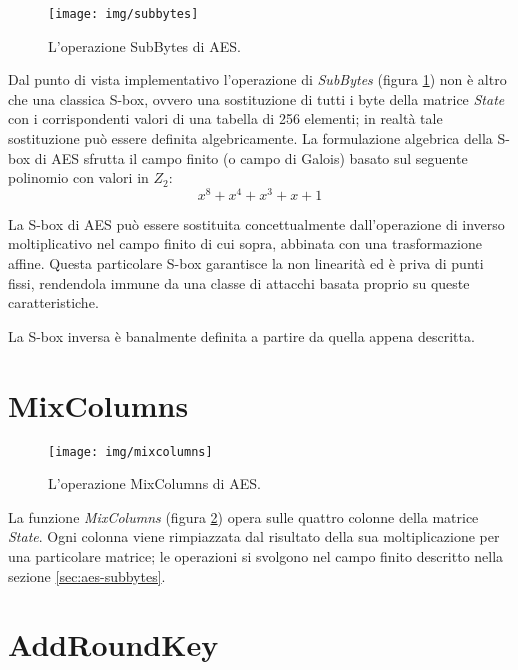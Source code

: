 \documentclass[12pt,a4paper,oneside]{book}
\begin{document}
\begin{figure}[h]
\begin{center}
\texttt{[image: img/subbytes]}
\caption{L'operazione SubBytes di AES.\label{fig:aes-subbytes}}
\end{center}
\end{figure}

Dal punto di vista implementativo l'operazione di \textit{SubBytes} (figura \ref{fig:aes-subbytes}) non è altro che una classica \ac{S-box}, ovvero una sostituzione di tutti i byte della matrice \textit{State} con i corrispondenti valori di una tabella di 256 elementi; in realtà tale sostituzione può essere definita algebricamente. La formulazione algebrica della \ac{S-box} di \ac{AES} sfrutta il campo finito (o campo di Galois) basato sul seguente polinomio con valori in $Z_2$:
\begin{displaymath}
x^8 + x^4 + x^3 + x + 1
\end{displaymath}

La \ac{S-box} di \ac{AES} può essere sostituita concettualmente dall'operazione di inverso moltiplicativo nel campo finito di cui sopra, abbinata con una trasformazione affine. Questa particolare \ac{S-box} garantisce la non linearità ed è priva di punti fissi, rendendola immune da una classe di attacchi basata proprio su queste caratteristiche\cite{bib:stinson}.

La \ac{S-box} inversa è banalmente definita a partire da quella appena descritta.

\section{MixColumns}

\begin{figure}[h]
\begin{center}
\texttt{[image: img/mixcolumns]}
\caption{L'operazione MixColumns di AES.\label{fig:aes-mixcolumns}}
\end{center}
\end{figure}

La funzione \textit{MixColumns} (figura \ref{fig:aes-mixcolumns}) opera sulle quattro colonne della matrice \textit{State}. Ogni colonna viene rimpiazzata dal risultato della sua moltiplicazione per una particolare matrice; le operazioni si svolgono nel campo finito descritto nella sezione \ref{sec:aes-subbytes}.

\section{AddRoundKey}
\end{document}
